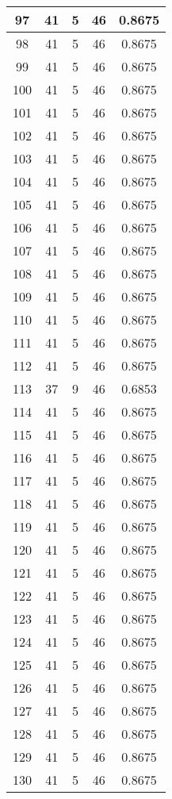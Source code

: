 \documentclass[letterpaper, 12pt]{article}
\begin{document}
\begin{longtable}{|c|c|c|c|c|}
\hline
97 & 41 & 5 & 46 & 0.8675 \\
\hline
98 & 41 & 5 & 46 & 0.8675 \\
\hline
99 & 41 & 5 & 46 & 0.8675 \\
\hline
100 & 41 & 5 & 46 & 0.8675 \\
\hline
101 & 41 & 5 & 46 & 0.8675 \\
\hline
102 & 41 & 5 & 46 & 0.8675 \\
\hline
103 & 41 & 5 & 46 & 0.8675 \\
\hline
104 & 41 & 5 & 46 & 0.8675 \\
\hline
105 & 41 & 5 & 46 & 0.8675 \\
\hline
106 & 41 & 5 & 46 & 0.8675 \\
\hline
107 & 41 & 5 & 46 & 0.8675 \\
\hline
108 & 41 & 5 & 46 & 0.8675 \\
\hline
109 & 41 & 5 & 46 & 0.8675 \\
\hline
110 & 41 & 5 & 46 & 0.8675 \\
\hline
111 & 41 & 5 & 46 & 0.8675 \\
\hline
112 & 41 & 5 & 46 & 0.8675 \\
\hline
113 & 37 & 9 & 46 & 0.6853 \\
\hline
114 & 41 & 5 & 46 & 0.8675 \\
\hline
115 & 41 & 5 & 46 & 0.8675 \\
\hline
116 & 41 & 5 & 46 & 0.8675 \\
\hline
117 & 41 & 5 & 46 & 0.8675 \\
\hline
118 & 41 & 5 & 46 & 0.8675 \\
\hline
119 & 41 & 5 & 46 & 0.8675 \\
\hline
120 & 41 & 5 & 46 & 0.8675 \\
\hline
121 & 41 & 5 & 46 & 0.8675 \\
\hline
122 & 41 & 5 & 46 & 0.8675 \\
\hline
123 & 41 & 5 & 46 & 0.8675 \\
\hline
124 & 41 & 5 & 46 & 0.8675 \\
\hline
125 & 41 & 5 & 46 & 0.8675 \\
\hline
126 & 41 & 5 & 46 & 0.8675 \\
\hline
127 & 41 & 5 & 46 & 0.8675 \\
\hline
128 & 41 & 5 & 46 & 0.8675 \\
\hline
129 & 41 & 5 & 46 & 0.8675 \\
\hline
130 & 41 & 5 & 46 & 0.8675 \\

\end{longtable}
\end{document}
